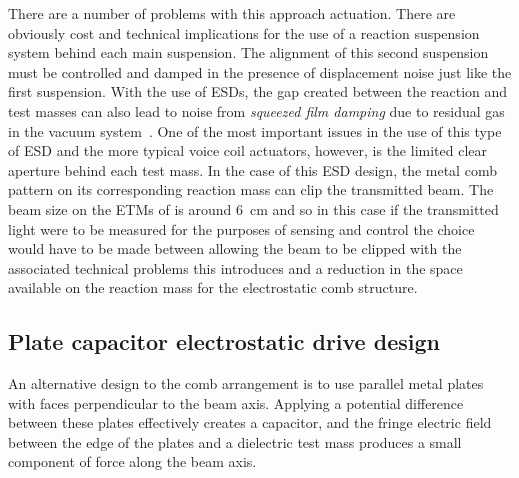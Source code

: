 There are a number of problems with this approach actuation. There are obviously cost and technical implications for the use of a reaction suspension system behind each main suspension. The alignment of this second suspension must be controlled and damped in the presence of displacement noise just like the first suspension. With the use of \glspl{ESD}, the gap created between the reaction and test masses can also lead to noise from \emph{squeezed film damping} due to residual gas in the vacuum system~\cite{Dolesi2011}. One of the most important issues in the use of this type of \gls{ESD} and the more typical voice coil actuators, however, is the limited clear aperture behind each test mass. In the case of this \gls{ESD} design, the metal comb pattern on its corresponding reaction mass can clip the transmitted beam. The beam size on the \glspl{ETM} of \ALIGO{} is around \SI{6}{\centi\meter} and so in this case if the transmitted light were to be measured for the purposes of sensing and control the choice would have to be made between allowing the beam to be clipped with the associated technical problems this introduces and a reduction in the space available on the reaction mass for the electrostatic comb structure.

\subsection{Plate capacitor electrostatic drive design}
An alternative design to the comb arrangement is to use parallel metal plates with faces perpendicular to the beam axis. Applying a potential difference between these plates effectively creates a capacitor, and the fringe electric field between the edge of the plates and a dielectric test mass produces a small component of force along the beam axis.


